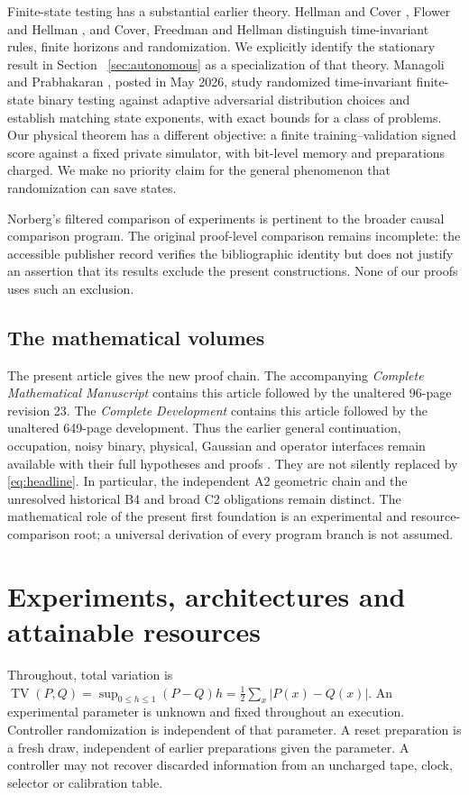 \documentclass[11pt]{amsart}
\theoremstyle{definition}\newtheorem{definition}[theorem]{Definition}
\theoremstyle{remark}\newtheorem{remark}[theorem]{Remark}
\newcommand{\TV}{\operatorname{TV}}
\newcommand{\1}{\mathbf 1}
\begin{document}
Finite-state testing has a substantial earlier theory. Hellman and Cover
\cite{HC,HCrandom}, Flower and Hellman \cite{FH}, and Cover, Freedman and
Hellman \cite{CFH} distinguish time-invariant rules, finite horizons and
randomization. We explicitly identify the stationary result in Section~
\ref{sec:autonomous} as a specialization of that theory. Managoli and
Prabhakaran \cite{MP}, posted in May 2026, study randomized time-invariant
finite-state binary testing against adaptive adversarial distribution
choices and establish matching state exponents, with exact bounds for a
class of problems. Our physical theorem has a different objective: a
finite training--validation signed score against a fixed private simulator,
with bit-level memory and preparations charged. We make no priority claim
for the general phenomenon that randomization can save states.

Norberg's filtered comparison of experiments \cite{Norberg} is pertinent
to the broader causal comparison program. The original proof-level
comparison remains incomplete: the accessible publisher record verifies
the bibliographic identity but does not justify an assertion that its
results exclude the present constructions. None of our proofs uses such
an exclusion.

\subsection{The mathematical volumes}
The present article gives the new proof chain. The accompanying
\emph{Complete Mathematical Manuscript} contains this article followed by
the unaltered 96-page revision 23. The \emph{Complete Development} contains
this article followed by the unaltered 649-page development. Thus the
earlier general continuation, occupation, noisy binary, physical,
Gaussian and operator interfaces remain available with their full
hypotheses and proofs \cite{Companion}. They are not silently replaced by
\eqref{eq:headline}. In particular, the independent A2 geometric chain and
the unresolved historical B4 and broad C2 obligations remain distinct.
The mathematical role of the present first foundation is an experimental
and resource-comparison root; a universal derivation of every program
branch is not assumed.

\section{Experiments, architectures and attainable resources}
\label{sec:model}
Throughout, total variation is
$\TV(P,Q)=\sup_{0\le h\le1}(P-Q)h=\frac12\sum_x|P(x)-Q(x)|$.
An experimental parameter is unknown and fixed throughout an execution.
Controller randomization is independent of that parameter. A reset
preparation is a fresh draw, independent of earlier preparations given
the parameter. A controller may not recover discarded information from
an uncharged tape, clock, selector or calibration table.
\end{document}
